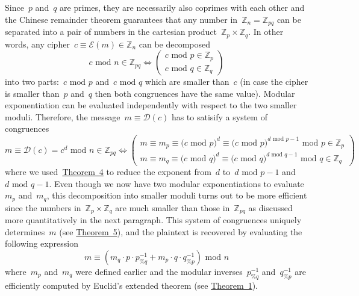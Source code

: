 \documentclass{article}
\begin{document}
\noindent Since~$p$ and~$q$ are primes, they are necessarily also coprimes with each other and the Chinese remainder theorem guarantees that any number in~$\mathbb{Z}_n = \mathbb{Z}_{pq}$ can be separated into a pair of numbers in the cartesian product~$\mathbb{Z}_p\times \mathbb{Z}_q$.  In other words, any cipher~$c \equiv \mathcal{E}(m) \in \mathbb{Z}_n$ can be decomposed
\begin{equation*}
c\,\,\text{mod}\,\,n \in \mathbb{Z}_{pq} \Longleftrightarrow \begin{pmatrix}
c \,\,\text{mod}\,\, p \in \mathbb{Z}_p \\
c \,\,\text{mod}\,\, q \in \mathbb{Z}_q
\end{pmatrix}
\end{equation*}
into two parts:~$c\,\,\text{mod}\,\,p$ and~$c\,\,\text{mod}\,\,q$ which are smaller than~$c$ (in case the cipher is smaller than~$p$ and~$q$ then both congruences have the same value). Modular exponentiation can be evaluated independently with respect to the two smaller moduli.  Therefore, the message~$m\equiv \mathcal{D}(c)$ has to satisify a system of congruences
\begin{equation*}
m\equiv \mathcal{D}(c) = c^d\,\,\text{mod}\,\,n \in \mathbb{Z}_{pq} \Longleftrightarrow 
\begin{pmatrix}
m\equiv m_p \equiv \big( c \,\,\text{mod}\,\, p \big)^d \equiv \big( c \,\,\text{mod}\,\, p \big)^{d\,\,\text{mod}\,\,p-1} \,\,\text{mod}\,\,p \in \mathbb{Z}_p \\
m\equiv m_q \equiv \big( c \,\,\text{mod}\,\, q \big)^d \equiv \big( c \,\,\text{mod}\,\, q \big)^{d\,\,\text{mod}\,\,q-1} \,\,\text{mod}\,\,q \in \mathbb{Z}_q
\end{pmatrix}
\end{equation*}
where we used~\hyperlink{theorem4}{Theorem~4} to reduce the exponent from~$d$ to~$d\,\,\text{mod}\,\,p-1$ and~$d\,\,\text{mod}\,\,q-1$.  Even though we now have two modular exponentiations to evaluate~$m_p$ and~$m_q$, this decomposition into smaller moduli turns out to be more efficient since the numbers in~$\mathbb{Z}_p \times \mathbb{Z}_q$ are much smaller than those in~$\mathbb{Z}_{pq}$ as discussed more quantitatively in the next paragraph. This system of congruences uniquely determines~$m$ (see \hyperlink{theorem5}{Theorem~5}), and the plaintext is recovered by evaluating the following expression
\begin{equation}
m \equiv \left( m_q \cdot p \cdot p^{-1}_{\%q} + m_p \cdot q \cdot q^{-1}_{\%p} \right) \,\,\text{mod}\,\,n
\label{eq::crt_system}
\end{equation}
where~$m_p$ and~$m_q$ were defined earlier and the modular inverses~$p^{-1}_{\%q}$ and~$q^{-1}_{\%p}$ are efficiently computed by Euclid's extended theorem (see \hyperlink{theorem1}{Theorem~1}). \\
\end{document}
